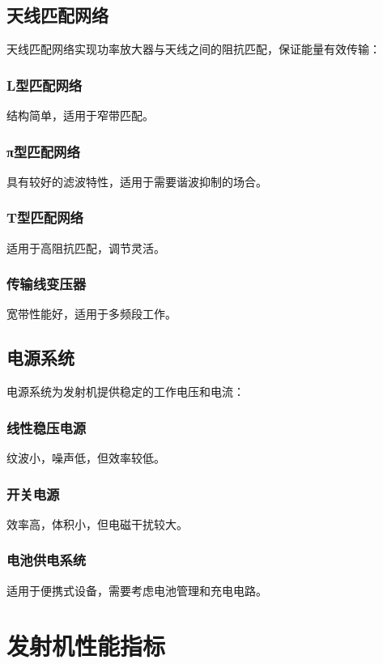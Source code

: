 \documentclass[12pt,UTF8]{ctexbook}
\begin{document}
\subsection{天线匹配网络}

天线匹配网络实现功率放大器与天线之间的阻抗匹配，保证能量有效传输：

\subsubsection{L型匹配网络}
结构简单，适用于窄带匹配。

\subsubsection{π型匹配网络}
具有较好的滤波特性，适用于需要谐波抑制的场合。

\subsubsection{T型匹配网络}
适用于高阻抗匹配，调节灵活。

\subsubsection{传输线变压器}
宽带性能好，适用于多频段工作。

\subsection{电源系统}

电源系统为发射机提供稳定的工作电压和电流：

\subsubsection{线性稳压电源}
纹波小，噪声低，但效率较低。

\subsubsection{开关电源}
效率高，体积小，但电磁干扰较大。

\subsubsection{电池供电系统}
适用于便携式设备，需要考虑电池管理和充电电路。

\section{发射机性能指标}
\end{document}
